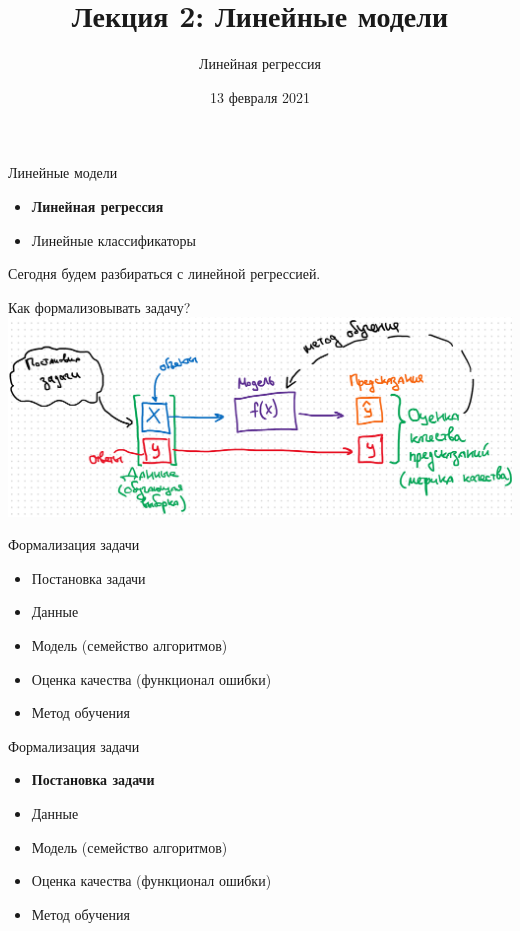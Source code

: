 \documentclass[aspectratio=169]{beamer}
\title{Лекция 2: Линейные модели}
\subtitle{Линейная регрессия}
\date{13 февраля 2021}
\begin{document}
\maketitle

\begin{frame}{Линейные модели}
    \begin{itemize}
        \item \textbf{Линейная регрессия}
        \item Линейные классификаторы
    \end{itemize}

    Сегодня будем разбираться с линейной регрессией.
\end{frame}

\begin{frame}{Как формализовывать задачу?}
    \includegraphics[width=\linewidth]{graphs/fig1.png}
\end{frame}

\begin{frame}{Формализация задачи}
    \begin{itemize}
        \item Постановка задачи
        \item Данные
        \item Модель (семейство алгоритмов)
        \item Оценка качества (функционал ошибки)
        \item Метод обучения
    \end{itemize}
\end{frame}

\begin{frame}{Формализация задачи}
    \begin{itemize}
        \item \textbf{Постановка задачи}
        \item Данные
        \item Модель (семейство алгоритмов)
        \item Оценка качества (функционал ошибки)
        \item Метод обучения
    \end{itemize}
\end{frame}
\end{document}
